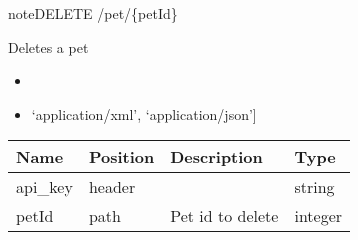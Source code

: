 \documentclass[letterpaper,10pt,english]{sphinxmanual}
\begin{document}
\begin{sphinxadmonition}{note}{DELETE /pet/\{petId\}}

Deletes a pet\begin{itemize}
\item {} 

\item {} 
\sphinxstylestrong{Produces: 
}{[}‘application/xml’, ‘application/json’{]}

\end{itemize}




\begin{savenotes}\sphinxattablestart
\centering
\begin{tabulary}{\linewidth}[t]{|T|T|T|T|}
\hline
\sphinxstyletheadfamily 
Name
&\sphinxstyletheadfamily 
Position
&\sphinxstyletheadfamily 
Description
&\sphinxstyletheadfamily 
Type
\\
\hline
api\_key
&
header
&

&
string
\\
\hline
petId
&
path
&
Pet id to delete
&
integer
\\
\hline
\end{tabulary}
\par
\sphinxattableend\end{savenotes}



\end{sphinxadmonition}
\end{document}

